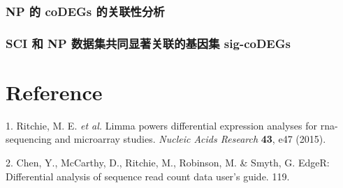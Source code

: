 \documentclass[
]{article}
\newenvironment{cslreferences}%
  {}%
  {\par}
\begin{document}
\hypertarget{np-ux7684-codegs-ux7684ux5173ux8054ux6027ux5206ux6790}{%
\subsubsection{NP 的 coDEGs 的关联性分析}\label{np-ux7684-codegs-ux7684ux5173ux8054ux6027ux5206ux6790}}

\hypertarget{sci-ux548c-np-ux6570ux636eux96c6ux5171ux540cux663eux8457ux5173ux8054ux7684ux57faux56e0ux96c6-sig-codegs}{%
\subsubsection{SCI 和 NP 数据集共同显著关联的基因集 sig-coDEGs}\label{sci-ux548c-np-ux6570ux636eux96c6ux5171ux540cux663eux8457ux5173ux8054ux7684ux57faux56e0ux96c6-sig-codegs}}

\hypertarget{bibliography}{%
\section*{Reference}\label{bibliography}}

\hypertarget{refs}{}
\begin{cslreferences}
\leavevmode\hypertarget{ref-LimmaPowersDiRitchi2015}{}%
1. Ritchie, M. E. \emph{et al.} Limma powers differential expression analyses for rna-sequencing and microarray studies. \emph{Nucleic Acids Research} \textbf{43}, e47 (2015).

\leavevmode\hypertarget{ref-EdgerDifferenChen}{}%
2. Chen, Y., McCarthy, D., Ritchie, M., Robinson, M. \& Smyth, G. EdgeR: Differential analysis of sequence read count data user's guide. 119.
\end{cslreferences}
\end{document}
